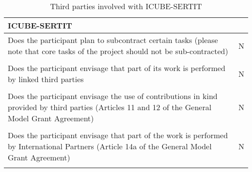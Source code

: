 \begin{table}[H]
	\centering
	\begin{tabular}{|p{10cm}|p{4cm}|}
		\hline
		
		\multicolumn{2}{|p{14cm}|}{\textbf{ICUBE-SERTIT}}\\
		
		\hline
		
		Does the participant plan to subcontract certain tasks (please note that core tasks of the project should not be sub-contracted) & N\\
		
		\hline
		
		\multicolumn{2}{|p{14cm}|}{}\\
		
		\hline
		
		Does the participant envisage that part of its work is performed by linked third parties & N\\
		
		\hline
		
		\multicolumn{2}{|p{14cm}|}{}\\
		
		\hline
		
		Does the participant envisage the use of contributions in kind provided by third parties (Articles 11 and 12 of the General Model Grant Agreement) & N\\
		
		\hline
		
		\multicolumn{2}{|p{14cm}|}{}\\
		
		\hline
		
		Does the participant envisage that part of the work is performed by International Partners (Article 14a of the General Model Grant Agreement) & N\\
		
		\hline
		
		\multicolumn{2}{|p{14cm}|}{}\\
		
		\hline
	\end{tabular}
	\caption{Third parties involved with ICUBE-SERTIT}
\end{table}




